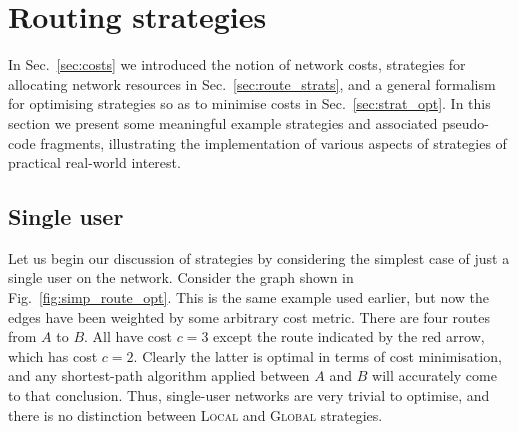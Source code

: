 \documentclass[aps, rmp, twocolumn, amsmath, amssymb, nofootinbib, superscriptaddress, longbibliography, floatfix, table-of-contents, eqsecnum]{revtex4-1}
\newcommand{\comment}[1]{{\color{blue}{\textbf{#1}}}}
\begin{document}
\comment{To do}

%
%

\section{Routing strategies} \label{sec:strategies} 

In Sec.~\ref{sec:costs} we introduced the notion of network costs, strategies for allocating network resources in Sec.~\ref{sec:route_strats}, and a general formalism for optimising strategies so as to minimise costs in Sec.~\ref{sec:strat_opt}. In this section we present some meaningful example strategies and associated pseudo-code fragments, illustrating the implementation of various aspects of strategies of practical real-world interest.

%
%

\subsection{Single user} \label{sec:single_user_shortest} 

Let us begin our discussion of strategies by considering the simplest case of just a single user on the network. Consider the graph shown in Fig.~\ref{fig:simp_route_opt}. This is the same example used earlier, but now the edges have been weighted by some arbitrary cost metric. There are four routes from $A$ to $B$. All have cost \mbox{$c=3$} except the route indicated by the red arrow, which has cost \mbox{$c=2$}. Clearly the latter is optimal in terms of cost minimisation, and any shortest-path algorithm applied between $A$ and $B$ will accurately come to that conclusion. Thus, single-user networks are very trivial to optimise, and there is no distinction between \textsc{Local} and \textsc{Global} strategies.
\end{document}
